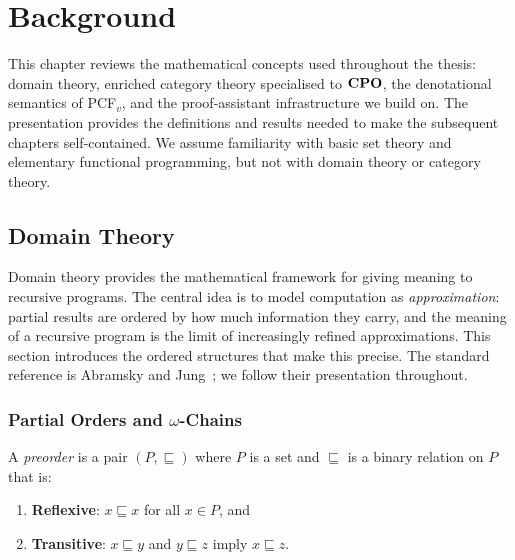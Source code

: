 
\chapter{Background}
\label{ch:background}

This chapter reviews the mathematical concepts used throughout the thesis:
domain theory, enriched category theory specialised to $\mathbf{CPO}$, the
denotational semantics of PCF$_v$, and the proof-assistant infrastructure
we build on. The presentation provides the definitions and results needed
to make the subsequent chapters self-contained. We assume familiarity with
basic set theory and elementary functional programming, but not with
domain theory or category theory.

\section{Domain Theory}
\label{sec:bg-domain-theory}

Domain theory provides the mathematical framework for giving meaning to
recursive programs. The central idea is to model computation as
\emph{approximation}: partial results are ordered by how much information
they carry, and the meaning of a recursive program is the limit of
increasingly refined approximations. This section introduces the ordered
structures that make this precise. The standard reference is Abramsky and
Jung~\cite{AJ1994}; we follow their presentation throughout.

\subsection{Partial Orders and $\omega$-Chains}
\label{sec:bg-partial-orders}

\begin{definition}[Preorder]
\label{def:preorder}
A \emph{preorder} is a pair $(P, \sqsubseteq)$ where $P$ is a set and
$\sqsubseteq$ is a binary relation on $P$ that is:
\begin{enumerate}
  \item \textbf{Reflexive}: $x \sqsubseteq x$ for all $x \in P$, and
  \item \textbf{Transitive}: $x \sqsubseteq y$ and $y \sqsubseteq z$
        imply $x \sqsubseteq z$.
\end{enumerate}
\end{definition}

